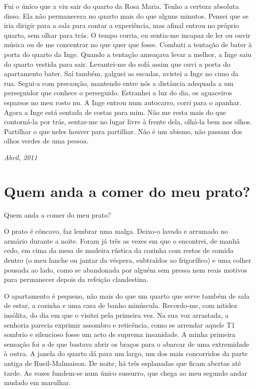 Fui o único que a viu sair do quarto da Rosa Maria. Tenho a certeza
absoluta disso. Ela não permanecera no quarto mais do que alguns
minutos. Pensei que se iria dirigir para a sala para contar a
experiência, mas afinal entrou no próprio quarto, sem olhar para trás. O
tempo corria, eu sentia-me incapaz de ler ou ouvir música ou de me
concentrar no que quer que fosse. Combati a tentação de bater à porta do
quarto da Inge. Quando a tentação ameaçava levar a melhor, a Inge saiu
do quarto vestida para sair. Levantei-me do sofá assim que ouvi a porta
do apartamento bater. Saí também, galguei as escadas, avistei a Inge no
cimo da rua. Segui-a com precaução, mantendo entre nós a distância
adequada a um perseguidor
que conhece o perseguido. Estranhei a luz do dia, os aguaceiros
esparsos no meu rosto nu. A Inge entrou num autocarro, corri para o
apanhar. Agora a Inge está sentada de costas para mim. Não me resta mais
do que contorná-la por trás, sentar-me no lugar livre à frente dela, olhá-la bem nos olhos. Partilhar o
que neles houver para partilhar. Não é um abismo, não passam dos olhos
verdes de uma pessoa.

\begin{flushright}
\emph{Abril, 2011}
\end{flushright}

\chapter{Quem anda a comer do meu
prato?}

Quem anda a comer do meu prato?

O prato é côncavo, faz lembrar uma malga. Deixo-o lavado e arrumado no
armário durante a noite. Foram já três as vezes em que o encontrei, de
manhã cedo, em cima da mesa de madeira rústica da cozinha com restos de
comida dentro (o meu lanche ou jantar da véspera, subtraídos ao
frigorífico) e uma colher pousada ao lado, como se abandonada por alguém
sem pressa nem reais motivos para permanecer depois da refeição
clandestina.

O apartamento é pequeno, não mais do que um quarto que serve também de
sala de estar, a cozinha e uma casa de banho minúscula. Recordo-me, com
nitidez insólita, do dia em que o visitei pela primeira vez. Na sua voz
arrastada, a senhoria parecia exprimir assombro e reticência, como se
arrendar aquele T1 sombrio e silencioso fosse um acto de suprema insanidade. A minha primeira sensação foi a de que bastava abrir os braços
para o abarcar de uma extremidade à outra. A janela do quarto dá para um
largo, um dos mais concorridos da parte antiga de Rueil-Malmaison. De
noite, há três esplanadas que ficam abertas até tarde. As vozes
fundem-se num único sussurro, que chega ao meu segundo andar mudado em marulhar.

